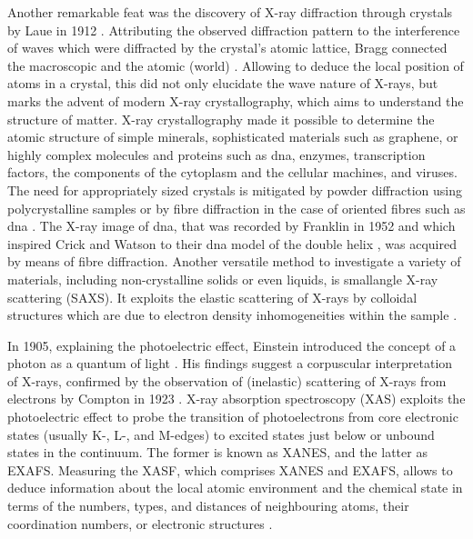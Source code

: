 \documentclass[
twoside,
openright,
titlepage,
numbers=noenddot,
headinclude,
fleqn,
a4paper,
footinclude=true,
cleardoublepage=empty,
abstractoff,
BCOR=5mm,
paper=a4,
fontsize=11pt,
british,ngerman,american,
]{scrreprt}
\begin{document}
Another remarkable feat was the discovery of X-ray diffraction through
crystals by Laue in 1912 \cite{Friedrich1913}.  Attributing the
observed diffraction pattern to the interference of waves which were
diffracted by the crystal's atomic lattice, Bragg connected the
macroscopic and the atomic (world) \cite{Bragg1913a}.  Allowing to
deduce the local position of atoms in a crystal, this did not only
elucidate the wave nature of X-rays, but marks the advent of modern
X-ray crystallography, which aims to understand the structure of
matter.  X-ray crystallography made it possible to determine the
atomic structure of simple minerals, sophisticated materials such as
graphene, or highly complex molecules and proteins such as \ac{dna},
enzymes, transcription factors, the components of the cytoplasm and
the cellular machines, and viruses.  The need for appropriately sized
crystals is mitigated by powder diffraction using polycrystalline
samples \cite{Debye1916,Hull1917} or by fibre diffraction in the case
of oriented fibres such as \ac{dna} \cite{Polanyl1921}.
The X-ray image of \ac{dna}, that was recorded by Franklin in 1952
\cite{FranklinGosling1953} and which inspired Crick and Watson to
their \ac{dna} model of the double helix \cite{Watson1953}, was
acquired by means of fibre diffraction.  Another versatile method to
investigate a variety of materials, including non-crystalline solids
or even liquids, is small\hyph angle X-ray scattering (SAXS).  It
exploits the elastic scattering of X-rays by colloidal structures
which are due to electron density inhomogeneities within the sample
\cite{GlatterKratky1982}.

In 1905, explaining the photoelectric effect, Einstein introduced the
concept of a photon as a quantum of light \cite{Einstein1905}.  His
findings suggest a corpuscular interpretation of X-rays, confirmed by
the observation of (inelastic) scattering of X-rays from electrons by
Compton in 1923 \cite{Compton1923}.  X-ray absorption spectroscopy
(XAS) exploits the photoelectric effect to probe the transition of
photoelectrons from core electronic states (usually K-, L-, and
M-edges) to excited states just below or unbound states in the
continuum.  %
The former is known as \ac{XANES}, and the latter as \ac{EXAFS}.
Measuring the \ac{XASF}, which comprises \ac{XANES} and \ac{EXAFS},
allows to deduce information about the local atomic
environment and the chemical state in terms of the numbers, types, and
distances of neighbouring atoms, their coordination numbers, or
electronic structures \cite{KoningsbergerPrins}.
\end{document}
